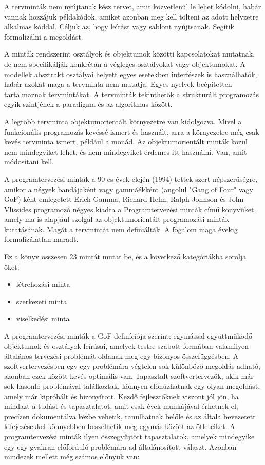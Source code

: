 \documentclass[margin=0px]{article}
\begin{document}
A tervminták nem nyújtanak kész tervet, amit közvetlenül le lehet kódolni, habár vannak hozzájuk példakódok, amiket azonban meg kell tölteni az adott helyzetre alkalmas kóddal. Céljuk az, hogy leírást vagy sablont nyújtsanak. Segítik formalizálni a megoldást.

A minták rendszerint osztályok és objektumok közötti kapcsolatokat mutatnak, de nem specifikálják konkrétan a végleges osztályokat vagy objektumokat. A modellek absztrakt osztályai helyett egyes esetekben interfészek is használhatók, habár azokat maga a tervminta nem mutatja. Egyes nyelvek beépítetten tartalmaznak tervmintákat. A tervminták tekinthetők a strukturált programozás egyik szintjének a paradigma és az algoritmus között.

A legtöbb tervminta objektumorientált környezetre van kidolgozva. Mivel a funkcionális programozás kevéssé ismert és használt, arra a környezetre még csak kevés tervminta ismert, például a monád. Az objektumorientált minták közül nem mindegyiket lehet, és nem mindegyiket érdemes itt használni. Van, amit módosítani kell.

A programtervezési minták a 90-es évek elején (1994) tettek szert népszerűségre, amikor a négyek bandájaként vagy gammáékként (angolul "Gang of Four" vagy GoF)-ként emlegetett Erich Gamma, Richard Helm, Ralph Johnson és John Vlissides programozó négyes kiadta a Programtervezési minták című könyvüket, amely ma is alapjául szolgál az objektumorientált programozási minták kutatásának. Magát a tervmintát nem definiálták. A fogalom maga évekig formalizálatlan maradt.

Ez a könyv összesen 23 mintát mutat be, és a következő kategóriákba sorolja őket:
\begin{itemize}
    \item létrehozási minta
    \item szerkezeti minta
    \item viselkedési minta
\end{itemize}

A programtervezési minták a GoF definíciója szerint: egymással együttműködő objektumok és osztályok leírásai, amelyek testre szabott formában valamilyen általános tervezési problémát oldanak meg egy bizonyos összefüggésben. A szoftvertervezésben egy-egy problémára végtelen sok különböző megoldás adható, azonban ezek között kevés optimális van. Tapasztalt szoftvertervezők, akik már sok hasonló problémával találkoztak, könnyen előhúzhatnak egy olyan megoldást, amely már kipróbált és bizonyított. Kezdő fejlesztőknek viszont jól jön, ha mindazt a tudást és tapasztalatot, amit csak évek munkájával érhetnek el, precízen dokumentálva kézbe vehetik, tanulhatnak belőle és az általa bevezetett kifejezésekkel könnyebben beszélhetik meg egymás között az ötleteiket. A programtervezési minták ilyen összegyűjtött tapasztalatok, amelyek mindegyike egy-egy gyakran előforduló problémára ad általánosított választ. Azonban mindezek mellett még számos előnyük van:
\end{document}
